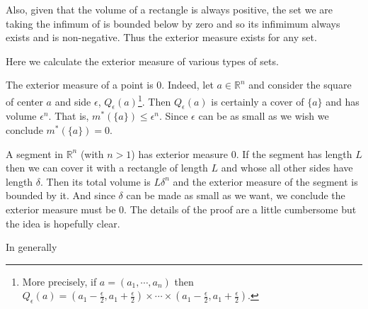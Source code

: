 \documentclass[12pt,oneside]{book}
\numberwithin{table}{section}
\numberwithin{equation}{section}
\numberwithin{figure}{section}
\newcommand{\R}{\mathbb{R}}
\newcommand{\ext}[1]{ m^{*}( #1 ) }
\begin{document}
Also, given that the volume of a rectangle is always positive, the set we are taking the infimum of is bounded below by zero and so its infimimum always exists and is non-negative. Thus the exterior measure exists for any set. 

\begin{exe}
	Here we calculate the exterior measure of various types of sets.
	\begin{points}
	\item The exterior measure of a point is 0. Indeed, let \( a \in \R^n \) and consider the square of center \( a \) and side \( \epsilon \), \( Q_\epsilon(a) \)\footnote{More precisely, if \( a = (a_1, \cdots, a_n) \) then \( Q_\epsilon(a) = (a_1 - \frac{\epsilon}{2}, a_1 + \frac{\epsilon}{2}) \times \cdots \times (a_1 - \frac{\epsilon}{2}, a_1 + \frac{\epsilon}{2}) \).}. Then \( Q_\epsilon(a) \) is certainly a cover of \( \{ a\} \) and has volume \( \epsilon^n \). That is, \( \ext{\{ a \}} \leq \epsilon^n \). Since \( \epsilon \) can be as small as we wish we conclude \( \ext{\{ a \}} = 0 \).

	\item A segment in \( \R^n \) (with \( n > 1 \)) has exterior measure 0. If the segment has length \( L \) then we can cover it with a rectangle of length \( L \) and whose all other sides have length \( \delta \). Then its total volume is \( L\delta^n \) and the exterior measure of the segment is bounded by it. And since \( \delta \) can be made as small as we want, we conclude the exterior measure must be 0. The details of the proof are a little cumbersome but the idea is hopefully clear.

	\item In generally 
	\end{points}
\end{exe}
\end{document}
